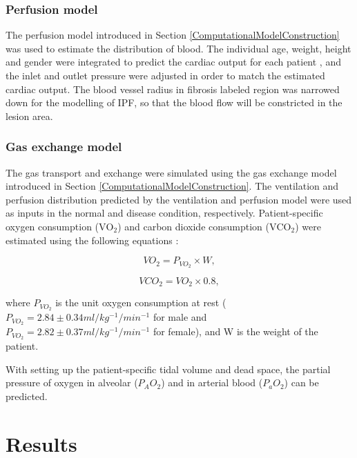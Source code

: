 \subsubsection{Perfusion model}
The perfusion model introduced in Section \ref{ComputationalModelConstruction} was used to estimate the distribution of blood. The individual age, weight, height and gender were integrated to predict the cardiac output for each patient \citep{brandfonbrener1955changes, miyamura1973maximum, stelfox2006hemodynamic}, and the inlet and outlet pressure were adjusted in order to match the estimated cardiac output. The blood vessel radius in fibrosis labeled region was narrowed down for the modelling of IPF, so that the blood flow will be constricted in the lesion area.

\subsubsection{Gas exchange model}
The gas transport and exchange were simulated using the gas exchange model introduced in Section \ref{ComputationalModelConstruction}. The ventilation and perfusion distribution predicted by the ventilation and perfusion model were used as inputs in the normal and disease condition, respectively. Patient-specific oxygen consumption ($\mathrm{VO_2}$) and carbon dioxide consumption ($\mathrm{VCO_2}$) were estimated using the following equations \citep{kwan2004standard, coelho2013estimation}:

\begin{equation} 
 \label{eq:O2ConsumptionEstimation}
 VO_2 = P_{VO_2} \times W,
\end{equation}

\begin{equation} 
 \label{eq:CO2ConsumptionEstimation}
 VCO_2 = VO_2 \times 0.8,
\end{equation}

\noindent where $P_{VO_2}$ is the unit oxygen consumption at rest ($P_{VO_2} = 2.84 \pm 0.34 ml/kg^{-1}/min^{-1}$ for male and $P_{VO_2} = 2.82 \pm 0.37 ml/kg^{-1}/min^{-1}$ for female), and W is the weight of the patient.

With setting up the patient-specific tidal volume and dead space, the partial pressure of oxygen in alveolar ($P_AO_2$) and in arterial blood ($P_aO_2$) can be predicted.
\newpage

\section{Results}
